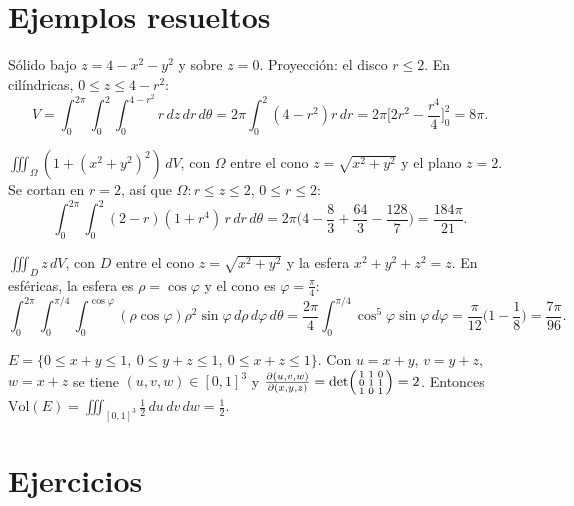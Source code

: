 \documentclass[11pt,a4paper]{article}
\newcommand{\dV}{\,dV}
\begin{document}
\section{Ejemplos resueltos}

\begin{ejemplo}
Sólido bajo $z=4-x^2-y^2$ y sobre $z=0$. Proyección: el disco $r\le2$. En cilíndricas, $0\le z\le4-r^2$:
\[
V=\int_0^{2\pi}\!\!\int_0^2\!\!\int_0^{4-r^2}r\,dz\,dr\,d\theta=2\pi\int_0^2(4-r^2)r\,dr=2\pi\Big[2r^2-\frac{r^4}4\Big]_0^2=8\pi .
\]
\end{ejemplo}

\begin{ejemplo}
$\iiint_\Omega(1+(x^2+y^2)^2)\dV$, con $\Omega$ entre el cono $z=\sqrt{x^2+y^2}$ y el plano $z=2$. Se cortan en $r=2$, así que $\Omega: r\le z\le2$, $0\le r\le2$:
\[
\int_0^{2\pi}\!\!\int_0^2(2-r)(1+r^4)\,r\,dr\,d\theta=2\pi\Big(4-\frac83+\frac{64}3-\frac{128}7\Big)=\frac{184\pi}{21}.
\]
\end{ejemplo}

\begin{ejemplo}
$\iiint_D z\dV$, con $D$ entre el cono $z=\sqrt{x^2+y^2}$ y la esfera $x^2+y^2+z^2=z$. En esféricas, la esfera es $\rho=\cos\varphi$ y el cono es $\varphi=\frac\pi4$:
\[
\int_0^{2\pi}\!\!\int_0^{\pi/4}\!\!\int_0^{\cos\varphi}(\rho\cos\varphi)\rho^2\sin\varphi\,d\rho\,d\varphi\,d\theta
=\frac{2\pi}4\int_0^{\pi/4}\cos^5\varphi\sin\varphi\,d\varphi=\frac\pi{12}\Big(1-\frac18\Big)=\frac{7\pi}{96}.
\]
\end{ejemplo}

\begin{ejemplo}
$E=\{0\le x+y\le1,\ 0\le y+z\le1,\ 0\le x+z\le1\}$. Con $u=x+y$, $v=y+z$, $w=x+z$ se tiene $(u,v,w)\in[0,1]^3$ y
$\frac{\partial(u,v,w)}{\partial(x,y,z)}=\det\begin{psmallmatrix}1&1&0\\0&1&1\\1&0&1\end{psmallmatrix}=2$. Entonces $\mathrm{Vol}(E)=\iiint_{[0,1]^3}\frac12\,du\,dv\,dw=\frac12$.
\end{ejemplo}

\section{Ejercicios}
\end{document}
